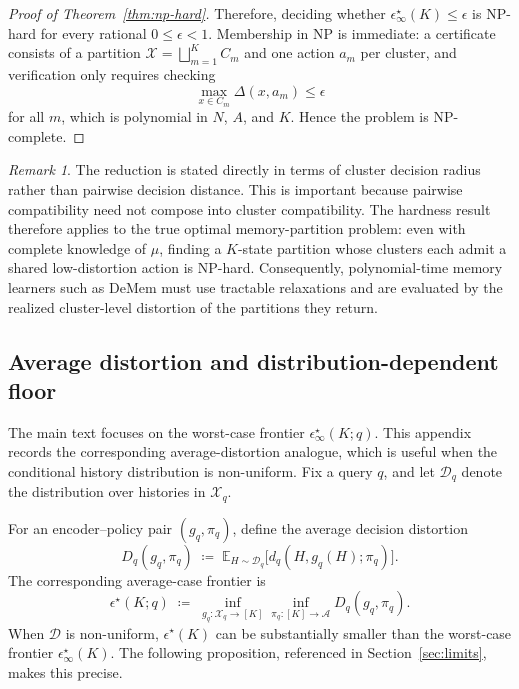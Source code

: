 \documentclass{article}
\theoremstyle{plain}
\theoremstyle{definition}
\theoremstyle{remark}
\newtheorem{remark}{Remark}
\newcommand{\cA}{\mathcal{A}}
\newcommand{\cX}{\mathcal{X}}
\newcommand{\cD}{\mathcal{D}}
\newcommand{\eps}{\epsilon}
\newcommand{\EE}{\mathbb{E}}
\begin{document}
\begin{proof}[Proof of Theorem~\ref{thm:np-hard}]
Therefore, deciding whether \(\eps^\star_\infty(K)\le\eps\) is NP-hard for
every rational \(0\le\eps<1\). Membership in NP is immediate: a certificate
consists of a partition \(\cX=\bigsqcup_{m=1}^K C_m\) and one action
\(a_m\) per cluster, and verification only requires checking
\[
\max_{x\in C_m}\Delta(x,a_m)\le\eps
\]
for all \(m\), which is polynomial in \(N\), \(A\), and \(K\). Hence the
problem is NP-complete.
\end{proof}

\begin{remark}
\label{rem:hardness-implications}
The reduction is stated directly in terms of cluster decision radius rather
than pairwise decision distance. This is important because pairwise
compatibility need not compose into cluster compatibility. The hardness
result therefore applies to the true optimal memory-partition problem:
even with complete knowledge of \(\mu\), finding a \(K\)-state partition
whose clusters each admit a shared low-distortion action is NP-hard.
Consequently, polynomial-time memory learners such as DeMem must
use tractable relaxations and are evaluated by the realized cluster-level
distortion of the partitions they return.
\end{remark}




\subsection{Average distortion and distribution-dependent floor}
\label{app:avg-distortion}

The main text focuses on the worst-case frontier
\(\eps^\star_\infty(K;q)\). This appendix records the corresponding
average-distortion analogue, which is useful when the conditional history
distribution is non-uniform. Fix a query \(q\), and let \(\cD_q\) denote the
distribution over histories in \(\cX_q\).

For an encoder--policy pair \((g_q,\pi_q)\), define the average decision
distortion
\begin{equation}
\label{eq:avg-distortion-app}
D_q(g_q,\pi_q)
\;\coloneqq\;
\EE_{H\sim\cD_q}
\bigl[d_q(H,g_q(H);\pi_q)\bigr].
\end{equation}
The corresponding average-case frontier is
\begin{equation}
\label{eq:avg-frontier-app}
\eps^\star(K;q)
\;\coloneqq\;
\inf_{g_q:\cX_q\to[K]}
\inf_{\pi_q:[K]\to\cA}
D_q(g_q,\pi_q).
\end{equation}
When \(\cD\) is non-uniform, \(\eps^\star(K)\) can be substantially smaller
than the worst-case frontier \(\eps^\star_\infty(K)\). The following
proposition, referenced in Section~\ref{sec:limits}, makes this precise.
\end{document}

